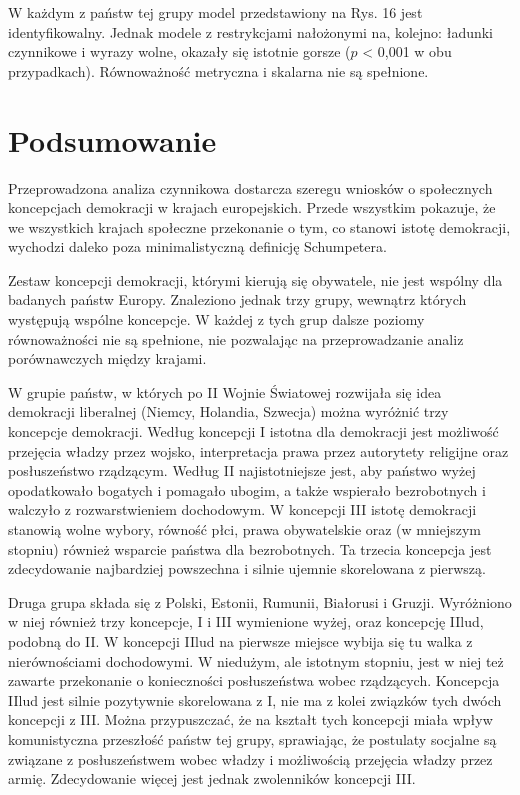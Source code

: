 \documentclass[12pt]{article}
\begin{document}
W każdym z państw tej grupy model przedstawiony na Rys. 16 jest identyfikowalny. Jednak modele z restrykcjami nałożonymi na, kolejno: ładunki czynnikowe i wyrazy wolne, okazały się istotnie gorsze (\(p\) \textless{} 0,001 w obu przypadkach). Równoważność metryczna i skalarna nie są spełnione.

\newpage

\hypertarget{podsumowanie}{%
\section{Podsumowanie}\label{podsumowanie}}

Przeprowadzona analiza czynnikowa dostarcza szeregu wniosków o społecznych koncepcjach demokracji w krajach europejskich. Przede wszystkim pokazuje, że we wszystkich krajach społeczne przekonanie o tym, co stanowi istotę demokracji, wychodzi daleko poza minimalistyczną definicję Schumpetera.

Zestaw koncepcji demokracji, którymi kierują się obywatele, nie jest wspólny dla badanych państw Europy. Znaleziono jednak trzy grupy, wewnątrz których występują wspólne koncepcje. W każdej z tych grup dalsze poziomy równoważności nie są spełnione, nie pozwalając na przeprowadzanie analiz porównawczych między krajami.

W grupie państw, w których po II Wojnie Światowej rozwijała się idea demokracji liberalnej (Niemcy, Holandia, Szwecja) można wyróżnić trzy koncepcje demokracji. Według koncepcji I istotna dla demokracji jest możliwość przejęcia władzy przez wojsko, interpretacja prawa przez autorytety religijne oraz posłuszeństwo rządzącym. Według II najistotniejsze jest, aby państwo wyżej opodatkowało bogatych i pomagało ubogim, a także wspierało bezrobotnych i walczyło z rozwarstwieniem dochodowym. W koncepcji III istotę demokracji stanowią wolne wybory, równość płci, prawa obywatelskie oraz (w mniejszym stopniu) również wsparcie państwa dla bezrobotnych. Ta trzecia koncepcja jest zdecydowanie najbardziej powszechna i silnie ujemnie skorelowana z pierwszą.

Druga grupa składa się z Polski, Estonii, Rumunii, Białorusi i Gruzji. Wyróżniono w niej również trzy koncepcje, I i III wymienione wyżej, oraz koncepcję IIlud, podobną do II. W koncepcji IIlud na pierwsze miejsce wybija się tu walka z nierównościami dochodowymi. W niedużym, ale istotnym stopniu, jest w niej też zawarte przekonanie o konieczności posłuszeństwa wobec rządzących. Koncepcja IIlud jest silnie pozytywnie skorelowana z I, nie ma z kolei związków tych dwóch koncepcji z III. Można przypuszczać, że na kształt tych koncepcji miała wpływ komunistyczna przeszłość państw tej grupy, sprawiając, że postulaty socjalne są związane z posłuszeństwem wobec władzy i możliwością przejęcia władzy przez armię. Zdecydowanie więcej jest jednak zwolenników koncepcji III.
\end{document}
